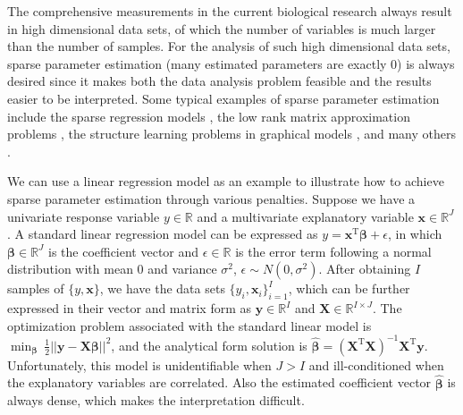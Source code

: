 The comprehensive measurements in the current biological research always result in high dimensional data sets, of which the number of variables is much larger than the number of samples. For the analysis of such high dimensional data sets, sparse parameter estimation (many estimated parameters are exactly 0) is always desired since it makes both the data analysis problem feasible and the results easier to be interpreted. Some typical examples of sparse parameter estimation include the sparse regression models \cite{fan2001variable}, the low rank matrix approximation problems \cite{jolliffe2002principal, smilde2017common, gavish2017optimal}, the structure learning problems in graphical models \cite{friedman2008sparse}, and many others \cite{tibshirani2005sparsity, witten2009penalized,huang2012selective}.

We can use a linear regression model as an example to illustrate how to achieve sparse parameter estimation through various penalties. Suppose we have a univariate response variable $y\in \mathbb{R}$ and a multivariate explanatory variable $\mathbf{x} \in \mathbb{R}^{J}$. A standard linear regression model can be expressed as $y = \mathbf{x}^{\text{T}}\bm{\beta} + \epsilon$, in which $\bm{\beta} \in \mathbb{R}^{J}$ is the coefficient vector and $\epsilon \in \mathbb{R}$ is the error term following a normal distribution with mean $0$ and variance $\sigma^2$, $\epsilon \sim N(0,\sigma^2)$. After obtaining $I$ samples of $\{y, \mathbf{x}\}$, we have the data sets $\{y_i, \mathbf{x}_i\}_{i=1}^{I}$, which can be further expressed in their vector and matrix form as $\mathbf{y} \in \mathbb{R}^{I}$ and $\mathbf{X} \in \mathbb{R}^{I\times J}$. The optimization problem associated with the standard linear model is $\min_{\bm{\beta}} ~ \frac{1}{2}||\mathbf{y} - \mathbf{X}\bm{\beta}||^2$, and the analytical form solution is $\hat{\bm{\beta}} = (\mathbf{X}^{\text{T}}\mathbf{X})^{-1}\mathbf{X}^{\text{T}}\mathbf{y}$. Unfortunately, this model is unidentifiable when $J>I$ and ill-conditioned when the explanatory variables are correlated. Also the estimated coefficient vector $\hat{\bm{\beta}}$ is always dense, which makes the interpretation difficult.

